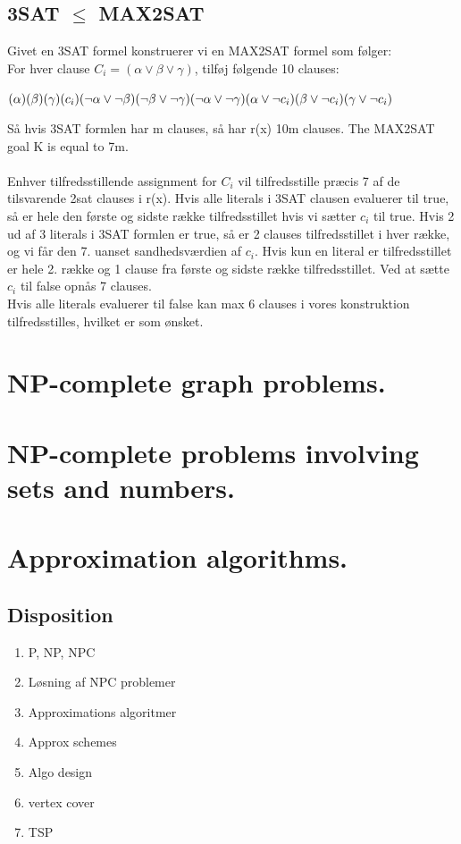 \documentclass{article}
\begin{document}
\subsection{3SAT $\le$ MAX2SAT}
Givet en 3SAT formel konstruerer vi en MAX2SAT formel som følger: 
\\
For hver clause $C_i = (\alpha \lor \beta \lor \gamma)$, tilføj følgende 10 clauses:
\begin{center}
    $(\alpha)(\beta)(\gamma)(c_i)\\
    (\lnot \alpha \lor \lnot \beta)(\lnot \beta \lor \lnot \gamma)(\lnot \alpha \lor \lnot \gamma)\\
    (\alpha \lor \lnot c_i)(\beta \lor \lnot c_i)(\gamma \lor \lnot c_i)$
\end{center}
Så hvis 3SAT formlen har m clauses, så har r(x) 10m clauses. The MAX2SAT goal K is equal to 7m.\\\\
Enhver tilfredsstillende assignment for $C_i$ vil tilfredsstille præcis 7 af de tilsvarende 2sat clauses i r(x). Hvis alle literals i 3SAT clausen evaluerer til true, så er hele den første og sidste række tilfredsstillet hvis vi sætter $c_i$ til true. Hvis 2 ud af 3 literals i 3SAT formlen er true, så er 2 clauses tilfredsstillet i hver række, og vi får den 7. uanset sandhedsværdien af $c_i$. Hvis kun en literal er tilfredsstillet er hele 2. række og 1 clause fra første og sidste række tilfredsstillet. Ved at sætte $c_i$ til false opnås 7 clauses.\\
Hvis alle literals evaluerer til false kan max 6 clauses i vores konstruktion tilfredsstilles, hvilket er som ønsket. 
\newpage
\section{NP-complete graph problems.}


\newpage

\section{NP-complete problems involving sets and numbers.}


\newpage

\section{Approximation algorithms.}
\subsection{Disposition}
\begin{enumerate}
    \item P, NP, NPC
    \item Løsning af NPC problemer
    \item Approximations algoritmer
    \item Approx schemes
    \item Algo design 
    \item vertex cover
    \item TSP
\end{enumerate}
\newpage
\end{document}
